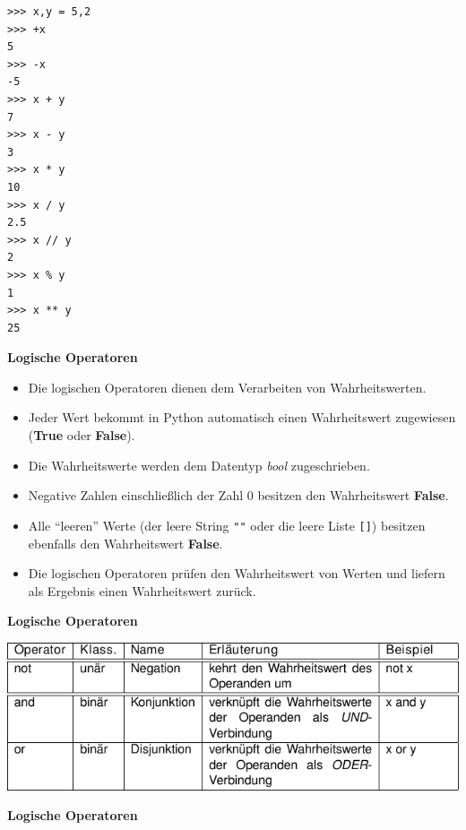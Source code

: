 \begin{verbatim}
>>> x,y = 5,2
>>> +x
5
>>> -x
-5
>>> x + y
7
>>> x - y
3
>>> x * y
10
>>> x / y
2.5
>>> x // y
2
>>> x % y
1
>>> x ** y
25
\end{verbatim}




\vspace{0.5cm}\par\noindent\textbf{Logische Operatoren}\vspace{0.5cm}

\begin{itemize}
\itemsep1pt\parskip0pt
\item
  {Die logischen Operatoren dienen dem Verarbeiten von Wahrheitswerten.}
\item
  {Jeder Wert bekommt in Python automatisch einen Wahrheitswert
  zugewiesen (\textbf{True} oder \textbf{False}).}
\item
  {Die Wahrheitswerte werden dem Datentyp \emph{bool} zugeschrieben.}
\item
  {Negative Zahlen einschließlich der Zahl $0$ besitzen den
  Wahrheitswert \textbf{False}.}
\item
  {Alle ``leeren'' Werte (der leere String \texttt{""} oder die leere
  Liste \texttt{{[}{]}}) besitzen ebenfalls den Wahrheitswert
  \textbf{False}.}
\item
  {Die logischen Operatoren prüfen den Wahrheitswert von Werten und
  liefern als Ergebnis einen Wahrheitswert zurück.}
\end{itemize}




\vspace{0.5cm}\par\noindent\textbf{Logische Operatoren}\vspace{0.5cm}

\includegraphics[width=\textwidth]{img/logische_operatoren.pdf}




\vspace{0.5cm}\par\noindent\textbf{Logische Operatoren}\vspace{0.5cm}

